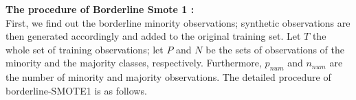 
\textbf{The procedure of Borderline Smote 1 :} \\ 

First, we find out the borderline minority observations; synthetic observations are then generated accordingly and added to the original training set. Let $T$ the whole set of training observations; let  $P$ and  $N$ be the sets of observations of the minority and the majority classes, respectively. Furthermore, $p_{num}$ and $n_{num}$ are the number of minority and majority observations. The detailed procedure of borderline-SMOTE1 is as follows.

